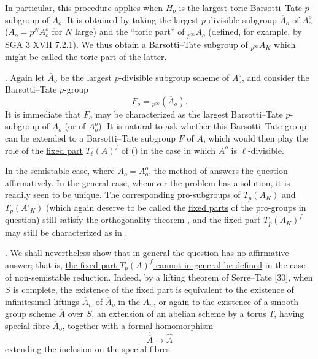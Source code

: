 In particular, this procedure applies when $H_o$ is the largest toric
Barsotti--Tate $p$-subgroup of $A_o$.  It is obtained by taking the
largest $p$-divisible subgroup $\overline A_o$ of $A_o^o$
($\overline A_o=p^N A_o^o$ for $N$ large) and the ``toric part'' of
${}_{p^\infty}\overline A_o$ (defined, for example, by SGA 3 XVII
7.2.1).  We thus obtain a Barsotti--Tate subgroup of
${}_{p^\infty}A_K$ which might be called the \underline{toric part} of
the latter.

\medskip
\noindent
{}. Again let $\overline A_o$ be the largest $p$-divisible subgroup
scheme of $A_o^o$, and consider the Barsotti--Tate $p$-group
\[
 F_o={}_{p^\infty}(\overline A_o).
\]
It is immediate that $F_o$ may be characterized as the largest
Barsotti--Tate $p$-subgroup of $A_o$ (or of $A_o^o$).  It is natural to
ask whether this Barsotti--Tate group can be extended to a
Barsotti--Tate subgroup $F$ of $A$, which would then play the role of
the \underline{fixed part} $T_\ell(A)^f$ of () in the case in
which $A^o$ is $\ell$-divisible.

In the semistable case, where $\overline A_o=A_o^o$, the method of 
answers the question affirmatively.  In the general case, whenever the
problem has a solution, it is readily seen to be unique.  The
corresponding pro-subgroups of $T_p(A_K)$ and $T_p(A'_K)$ (which again
deserve to be called the \underline{fixed parts} of the pro-groups in
question) still satisfy the orthogonality theorem , and the fixed
part $T_p(A_K)^f$ may still be characterized as in .

\medskip
\noindent
{}. We shall nevertheless show that in general the question has no
affirmative answer; that is, \underline{the fixed part $T_p(A)^f$
cannot in general be defined} in the case of non-semistable reduction.
Indeed, by a lifting theorem of Serre--Tate [30], when $S$ is complete,
the existence of the fixed part is equivalent to the existence of
infinitesimal liftings $\overline A_n$ of $\overline A_o$ in the $A_n$,
or again to the existence of a smooth group scheme $\overline A$ over
$S$, an extension of an abelian scheme by a torus $T$, having special
fibre $\overline A_o$, together with a formal homomorphism
\[
 \widehat{\overline A}\longrightarrow\widehat A
\]
extending the inclusion on the special fibres.


